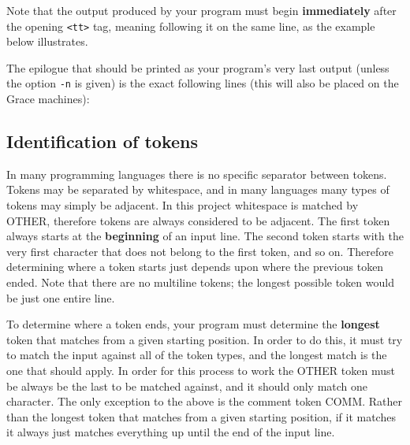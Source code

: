 \documentclass[11pt]{article}
\begin{document}
      \vspace{-1.5mm}

      \begin{quote}


      \end{quote}

      \vspace{-1.5mm}

      Note that the output produced by your program must begin
    \textbf{immediately} after the opening \texttt{<tt>} tag, meaning
    following it on the same line, as the example below illustrates.

      The epilogue that should be printed as your program's very last output
    (unless the option \texttt{-n} is given) is the exact following lines
    (this will also be placed on the Grace machines):

      \vspace{-2mm}

      \begin{quote}


      \end{quote}

      \vspace{-3mm}

    \subsection{Identification of tokens}

      In many programming languages there is no specific separator between
    tokens.  Tokens may be separated by whitespace, and in many languages
    many types of tokens may simply be adjacent.  In this project whitespace
    is matched by OTHER, therefore tokens are always considered to be
    adjacent.  The first token always starts at the \textbf{beginning} of an
    input line.  The second token starts with the very first character that
    does not belong to the first token, and so on.  Therefore determining
    where a token starts just depends upon where the previous token ended.
    Note that there are no multiline tokens; the longest possible token
    would be just one entire line.

      To determine where a token ends, your program must determine the
    \textbf{longest} token that matches from a given starting position.  In
    order to do this, it must try to match the input against all of the
    token types, and the longest match is the one that should apply.  In
    order for this process to work the OTHER token must be always be the
    last to be matched against, and it should only match one character.  The
    only exception to the above is the comment token COMM.  Rather than the
    longest token that matches from a given starting position, if it matches
    it always just matches everything up until the end of the input line.
\end{document}
